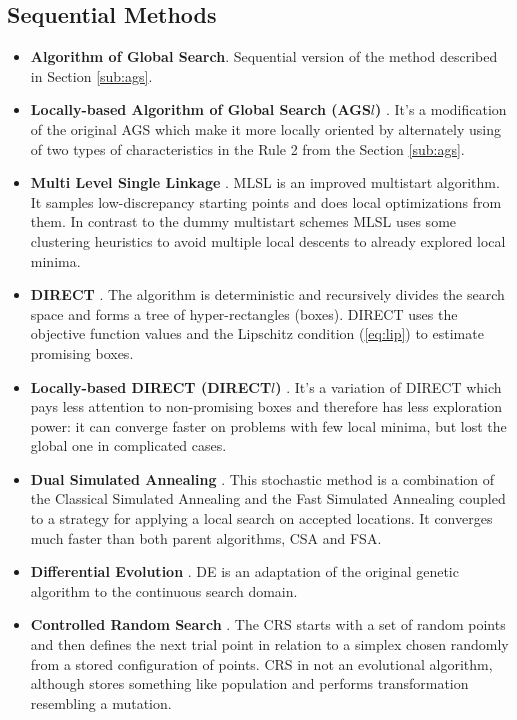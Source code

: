 \documentclass{svproc}
\begin{document}
\subsection{Sequential Methods}
\begin{itemize}
  \item \textbf{Algorithm of Global Search}. Sequential version of the method described in Section
\ref{sub:ags}.

  \item \textbf{Locally-based Algorithm of Global Search (AGS\(l\))} \cite{indexMethod}. It's a
modification of
  the original AGS which make it more locally oriented by alternately using of two types of
characteristics in the Rule 2 from the Section \ref{sub:ags}.

  \item \textbf{Multi Level Single Linkage} \cite{Kan1987StochasticGO}. MLSL is an improved
multistart algorithm.
  It samples low-discrepancy starting points and does local optimizations from them. In contrast to
the dummy multistart schemes
  MLSL uses some clustering heuristics to avoid multiple local descents to already explored local
minima.

  \item \textbf{DIRECT} \cite{Jones2009}. The algorithm is deterministic and recursively divides
the search space and forms a tree of hyper-rectangles (boxes). DIRECT uses the objective function
values and the Lipschitz condition (\ref{eq:lip}) to estimate promising boxes.

  \item \textbf{Locally-based DIRECT (DIRECT$l$)} \cite{Gablonsky2001}. It's a variation of
DIRECT which pays less attention to non-promising boxes and therefore
  has less exploration power: it can converge faster on problems with few local minima, but lost the
global one in complicated cases.

  \item \textbf{Dual Simulated Annealing} \cite{XIANG1997216}. This stochastic method is a
combination of the Classical Simulated Annealing and the Fast Simulated Annealing coupled to a
strategy for applying a local search on accepted locations. It converges much faster than both parent
algorithms, CSA and FSA.

  \item \textbf{Differential Evolution} \cite{Storn1997}. DE is an adaptation of the original genetic
algorithm to
  the continuous search domain.

  \item \textbf{Controlled Random Search} \cite{Price1983}. The CRS starts with a set of random
points and then defines
  the next trial point in relation to a simplex chosen randomly from a stored configuration of points.
CRS in not an
  evolutional algorithm, although stores something like population and performs transformation
resembling a mutation.


\end{itemize}
\end{document}
